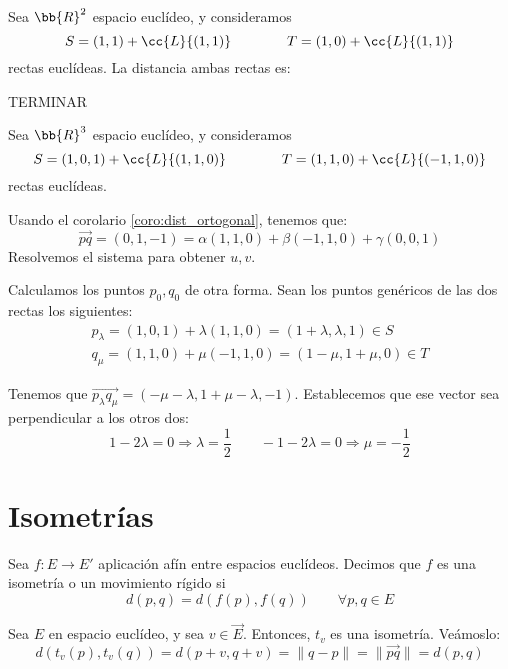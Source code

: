 \begin{ejemplo}
    Sea $\bb{R}^2$ espacio euclídeo, y consideramos
    $$S= (1,1)+\cc{L}\{(1,1)\} \qquad \qquad T= (1,0)+\cc{L}\{(1,1)\}$$ rectas euclídeas. La distancia ambas rectas es:

    TERMINAR
\end{ejemplo}


\begin{ejemplo}
    Sea $\bb{R}^3$ espacio euclídeo, y consideramos $$S= (1,0,1)+\cc{L}\{(1,1, 0)\}\qquad \qquad T= (1,1,0)+\cc{L}\{(-1,1,0)\}$$ rectas euclídeas.

    Usando el corolario \ref{coro:dist_ortogonal}, tenemos que:
    \begin{equation*}
        \vec{pq} = (0,1,-1) = \alpha(1,1,0) + \beta(-1,1,0) + \gamma(0,0,1)
    \end{equation*}
    Resolvemos el sistema para obtener $u,v$.

    Calculamos los puntos $p_0,q_0$ de otra forma. Sean los puntos genéricos de las dos rectas los siguientes:
    \begin{gather*}
        p_\lambda=(1,0,1)+\lambda(1,1,0)=(1+\lambda, \lambda, 1) \in S \\
        q_\mu=(1,1,0)+\mu(-1,1,0)=(1-\mu, 1+\mu, 0) \in T
    \end{gather*}

    Tenemos que $\vec{p_\lambda q_\mu}=(-\mu-\lambda, 1+\mu-\lambda, -1)$. Establecemos que ese vector sea perpendicular a los otros dos:
    \begin{equation*}
        1-2\lambda = 0\Longrightarrow \lambda=\frac{1}{2}
        \qquad
        -1-2\lambda=0 \Longrightarrow \mu = -\frac{1}{2}
    \end{equation*}
\end{ejemplo}



\section{Isometrías}
\begin{definicion}[Isometrías]
    Sea $f:E\to E'$ aplicación afín entre espacios euclídeos. Decimos que $f$ es una isometría o un movimiento rígido si 
    $$d(p,q)=d(f(p),f(q))\qquad \forall p,q\in E$$
\end{definicion}
\begin{ejemplo}
    Sea $E$ en espacio euclídeo, y sea $v\in \vec{E}$. Entonces, $t_v$ es una isometría. Veámoslo:
    \begin{equation*}
        d(t_v(p), t_v(q))=d(p+v, q+v)=\|q-p\|=\|\vec{pq}\|=d(p,q)
    \end{equation*}
\end{ejemplo}

